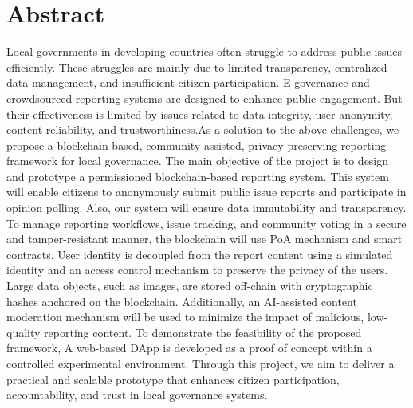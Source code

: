\documentclass[12pt, a4paper]{report}
\begin{document}


\renewcommand{\thepage}{\roman{page}} %

\chapter*{Abstract} %

Local governments in developing countries often struggle to address public issues efficiently. These struggles are mainly due to limited transparency, centralized data management, and insufficient citizen participation. E-governance and crowdsourced reporting systems are designed to enhance public engagement. But their effectiveness is limited by issues related to data integrity, user anonymity, content reliability, and trustworthiness.As a solution to the above challenges, we propose a blockchain-based, community-assisted, privacy-preserving reporting framework for local governance. The main objective of the project is to design and prototype a permissioned blockchain-based reporting system. This system will enable citizens to anonymously submit public issue reports and participate in opinion polling. Also, our system will ensure data immutability and transparency. To manage reporting workflows, issue tracking, and community voting in a secure and tamper-resistant manner, the blockchain will use \ac{PoA} mechanism and smart contracts. User identity is decoupled from the report content using a simulated identity and an access control mechanism to preserve the privacy of the users. Large data objects, such as images, are stored off-chain with cryptographic hashes anchored on the blockchain. Additionally, an \ac{AI}-assisted content moderation mechanism will be used to minimize the impact of malicious, low-quality reporting content.  To demonstrate the feasibility of the proposed framework, A web-based \ac{DApp} is developed as a proof of concept within a controlled experimental environment. Through this project, we  aim to deliver a practical and scalable prototype that enhances citizen participation, accountability, and trust in local governance systems.

 
\end{document}
